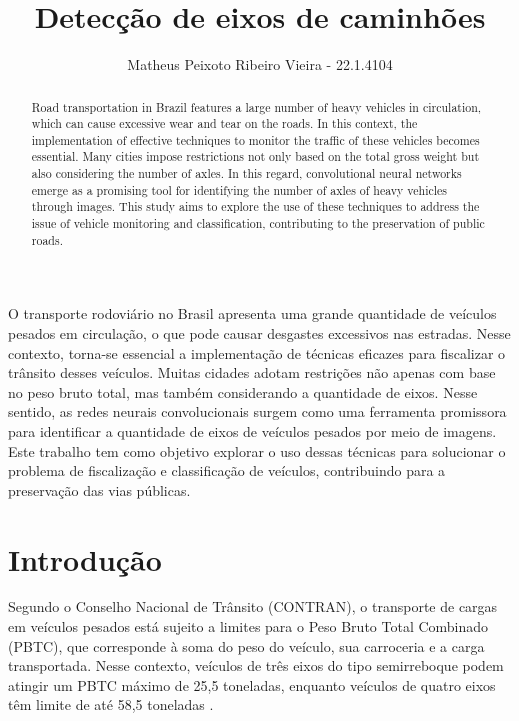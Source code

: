 \documentclass[12pt]{article}
\title{Detecção de eixos de caminhões}
\author{Matheus Peixoto Ribeiro Vieira - 22.1.4104}
\begin{document}
 

\maketitle

\begin{abstract}
    Road transportation in Brazil features a large number of heavy vehicles in circulation, which can cause excessive wear and tear on the roads. In this context, the implementation of effective techniques to monitor the traffic of these vehicles becomes essential. Many cities impose restrictions not only based on the total gross weight but also considering the number of axles. In this regard, convolutional neural networks emerge as a promising tool for identifying the number of axles of heavy vehicles through images. This study aims to explore the use of these techniques to address the issue of vehicle monitoring and classification, contributing to the preservation of public roads.
\end{abstract}
     
\begin{resumo} 
    O transporte rodoviário no Brasil apresenta uma grande quantidade de veículos pesados em circulação, o que pode causar desgastes excessivos nas estradas. Nesse contexto, torna-se essencial a implementação de técnicas eficazes para fiscalizar o trânsito desses veículos. Muitas cidades adotam restrições não apenas com base no peso bruto total, mas também considerando a quantidade de eixos. Nesse sentido, as redes neurais convolucionais surgem como uma ferramenta promissora para identificar a quantidade de eixos de veículos pesados por meio de imagens. Este trabalho tem como objetivo explorar o uso dessas técnicas para solucionar o problema de fiscalização e classificação de veículos, contribuindo para a preservação das vias públicas.
\end{resumo}


\section{Introdução}
    Segundo o Conselho Nacional de Trânsito (CONTRAN), o transporte de cargas em veículos pesados está sujeito a limites para o Peso Bruto Total Combinado (PBTC), que corresponde à soma do peso do veículo, sua carroceria e a carga transportada. Nesse contexto, veículos de três eixos do tipo semirreboque podem atingir um PBTC máximo de 25,5 toneladas, enquanto veículos de quatro eixos têm limite de até 58,5 toneladas \cite{resolucao_contran}.
    
\end{document}
